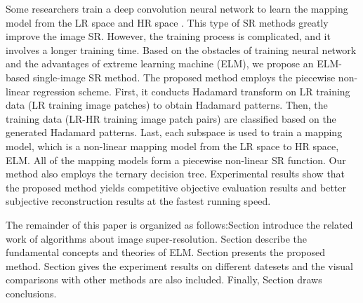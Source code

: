 \documentclass[review,numbers,sort&compress]{elsarticle}  %
\begin{document}
Some researchers train a deep convolution neural network to learn the mapping model from the LR space and HR space \cite{kim2016accurate} \cite{kim2016deeply} \cite{lai2017deep} \cite{shi2016real}. This type of SR methods greatly improve the image SR. However, the training process is complicated, and it involves a longer training time. Based on the obstacles of training neural network and the advantages of extreme learning machine (ELM), we propose an ELM-based single-image SR method. The proposed method employs the piecewise non-linear regression scheme. First, it conducts Hadamard transform on LR training data (LR training image patches) to obtain Hadamard patterns. Then, the training data (LR-HR training image patch pairs) are classified based on the generated Hadamard patterns. Last, each subspace is used to train a mapping model, which is a non-linear mapping model from the LR space to HR space, ELM. All of the mapping models form a piecewise non-linear SR function. Our method also employs the ternary decision tree. Experimental results show that the proposed method yields competitive objective evaluation results and better subjective reconstruction results at the fastest running speed.

The remainder of this paper is organized as follows:Section \uppercase\expandafter{} introduce the related work of algorithms about image super-resolution. Section \uppercase\expandafter{} describe the fundamental concepts and theories of ELM. Section \uppercase\expandafter{} presents the proposed method. Section \uppercase\expandafter{} gives the experiment results on different datesets and the visual comparisons with other methods are also included. Finally, Section \uppercase\expandafter{} draws conclusions.


\end{document}
